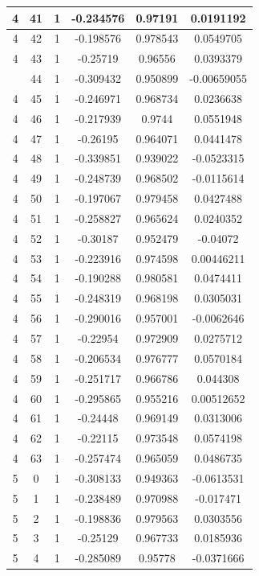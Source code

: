 \documentclass[12pt,a4paper]{article}
\numberwithin{equation}{section}
\numberwithin{figure}{section}
\numberwithin{table}{section}
\begin{document}
\begin{longtable}{|c|c|c|c|c|c|}
4 & 41 & 1 & -0.234576 & 0.97191 & 0.0191192 \\ \hline
4 & 42 & 1 & -0.198576 & 0.978543 & 0.0549705 \\ \hline
4 & 43 & 1 & -0.25719 & 0.96556 & 0.0393379 \\ \hline
\pagebreak
4 & 44 & 1 & -0.309432 & 0.950899 & -0.00659055 \\ \hline
4 & 45 & 1 & -0.246971 & 0.968734 & 0.0236638 \\ \hline
4 & 46 & 1 & -0.217939 & 0.9744 & 0.0551948 \\ \hline
4 & 47 & 1 & -0.26195 & 0.964071 & 0.0441478 \\ \hline
4 & 48 & 1 & -0.339851 & 0.939022 & -0.0523315 \\ \hline
4 & 49 & 1 & -0.248739 & 0.968502 & -0.0115614 \\ \hline
4 & 50 & 1 & -0.197067 & 0.979458 & 0.0427488 \\ \hline
4 & 51 & 1 & -0.258827 & 0.965624 & 0.0240352 \\ \hline
4 & 52 & 1 & -0.30187 & 0.952479 & -0.04072 \\ \hline
4 & 53 & 1 & -0.223916 & 0.974598 & 0.00446211 \\ \hline
4 & 54 & 1 & -0.190288 & 0.980581 & 0.0474411 \\ \hline
4 & 55 & 1 & -0.248319 & 0.968198 & 0.0305031 \\ \hline
4 & 56 & 1 & -0.290016 & 0.957001 & -0.0062646 \\ \hline
4 & 57 & 1 & -0.22954 & 0.972909 & 0.0275712 \\ \hline
4 & 58 & 1 & -0.206534 & 0.976777 & 0.0570184 \\ \hline
4 & 59 & 1 & -0.251717 & 0.966786 & 0.044308 \\ \hline
4 & 60 & 1 & -0.295865 & 0.955216 & 0.00512652 \\ \hline
4 & 61 & 1 & -0.24448 & 0.969149 & 0.0313006 \\ \hline
4 & 62 & 1 & -0.22115 & 0.973548 & 0.0574198 \\ \hline
4 & 63 & 1 & -0.257474 & 0.965059 & 0.0486735 \\ \hline
5 & 0 & 1 & -0.308133 & 0.949363 & -0.0613531 \\ \hline
5 & 1 & 1 & -0.238489 & 0.970988 & -0.017471 \\ \hline
5 & 2 & 1 & -0.198836 & 0.979563 & 0.0303556 \\ \hline
5 & 3 & 1 & -0.25129 & 0.967733 & 0.0185936 \\ \hline
5 & 4 & 1 & -0.285089 & 0.95778 & -0.0371666 \\ \hline

\end{longtable}
\end{document}
